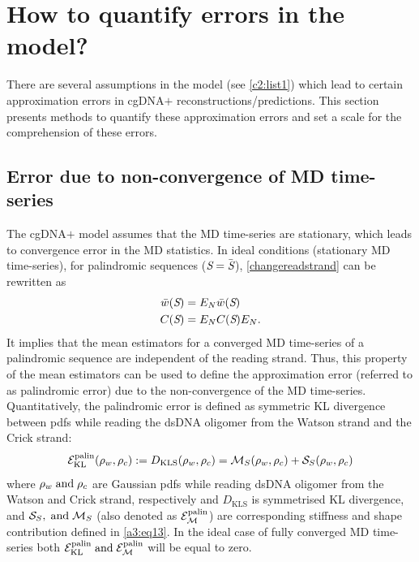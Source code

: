\section{How to quantify errors in the model?}\label{c2:sec5}
There are several assumptions in the model (see \cref{c2:list1}) which lead to certain approximation errors in cgDNA$+$ reconstructions/predictions. 
This section presents methods to quantify these approximation errors and set a scale for the comprehension of these errors.
\subsection{Error due to non-convergence of MD time-series}\label{c2:s5sb1}
The cgDNA$+$ model assumes that the MD time-series are stationary, which leads to convergence error in the MD statistics.
In ideal conditions (stationary MD time-series), for palindromic sequences (${\textit{S}}=\bar{{\textit{S}}}$), 
\cref{changereadstrand} can be rewritten as
\begin{equation}
\begin{split}
\bar{w}({\textit{S}}) &= E_{N}\bar{w}({\textit{S}})\\
C({\textit{S}}) &= E_{N}C({\textit{S}})E_{N}.
\end{split}
\label{error1}    
\end{equation}
It implies that the mean estimators for a converged MD time-series of a palindromic sequence are independent of the reading strand. 
Thus, this property of the mean estimators can be used to define the approximation error (referred to as palindromic error) due to the non-convergence of the MD time-series.
Quantitatively, the palindromic error is defined as symmetric KL divergence between pdfs while reading the dsDNA oligomer from the Watson strand and the Crick strand:
\begin{equation}
{\mathcal E}_{\text{KL}}^{\text{palin}}(\rho_w,\rho_c) := D_{\text{KLS}}(\rho_w,\rho_c) = \mathcal{M}_{S}(\rho_w,\rho_c) + {\mathcal S}_{S}(\rho_w,\rho_c) 
\label{error3palin}
\end{equation}
where $\rho_w {\;\text{and\;}} \rho_c$ are Gaussian pdfs while reading dsDNA oligomer from the Watson and Crick strand, respectively and $D_{\text{KLS}}$ is symmetrised KL divergence, and ${\mathcal S}_S, {\;\text{and\;}} \mathcal{M}_S$ (also denoted as ${\mathcal E}_{\mathcal{M}}^{\text{palin}}$) are corresponding stiffness and shape contribution defined in \cref{a3:eq13}.
In the ideal case of fully converged MD time-series both ${\mathcal E}_{\text{KL}}^{\text{palin}} {\;\text{and\;}} {\mathcal E}_{\mathcal{M}}^{\text{palin}}$ will be equal to zero. 
